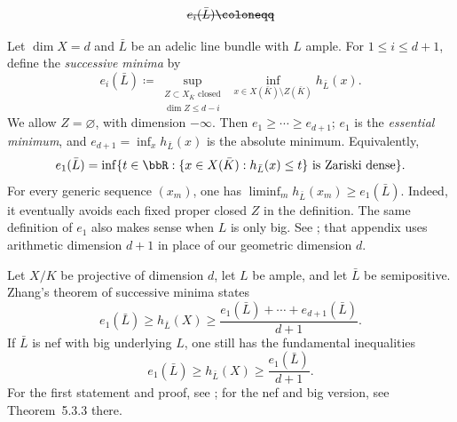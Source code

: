 \begin{definition}[label=\labelNFM{def:successive-minima}, status=draft, tag=0000000]
	\[ \latexdeletedmath{e_i(\bar L) \coloneqq} \]
	\Yang{}
	\begin{latexmathchange}
	Let $\dim X = d$ and $\bar L$ be an adelic line bundle with $L$ ample.
	For $1 \leq i \leq d+1$, define the \emph{successive minima} by
	\[ e_i(\bar L) \coloneqq \sup_{\substack{Z \subset X_{\bar K}\text{ closed}\\\dim Z \leq d-i}}\ \inf_{x \in X(\bar K)\setminus Z(\bar K)} h_{\bar L}(x). \]
	We allow $Z = \varnothing$, with dimension $-\infty$.
	Then $e_1 \geq \cdots \geq e_{d+1}$; $e_1$ is the \emph{essential minimum}, and $e_{d+1} = \inf_x h_{\bar L}(x)$ is the absolute minimum.
	Equivalently,
	\[ e_1(\bar L) = \inf\{t \in \bbR:\{x \in X(\bar K):h_{\bar L}(x) \leq t\}\text{ is Zariski dense}\}. \]
	For every generic sequence $(x_m)$, one has $\liminf_m h_{\bar L}(x_m) \geq e_1(\bar L)$.
	Indeed, it eventually avoids each fixed proper closed $Z$ in the definition.
	The same definition of $e_1$ also makes sense when $L$ is only big.
	See \cite[Appendix~A.5.5]{Yuan-Zhang-2026-AdelicLineBundles}; that appendix uses arithmetic dimension $d+1$ in place of our geometric dimension $d$.
	\end{latexmathchange}
\end{definition}

\begin{theorem}[label=\labelNFM{thm:fundamental-inequality-IV}, status=draft, tag=0000000]

	\Yang{}
	\begin{latexmathchange}
	Let $X/K$ be projective of dimension $d$, let $L$ be ample, and let $\bar L$ be semipositive.
	Zhang's theorem of successive minima states
	\[ e_1(\bar L) \geq h_{\bar L}(X) \geq \frac{e_1(\bar L)+\cdots+e_{d+1}(\bar L)}{d+1}. \]
	If $\bar L$ is nef with big underlying $L$, one still has the fundamental inequalities
	\[ e_1(\bar L) \geq h_{\bar L}(X) \geq \frac{e_1(\bar L)}{d+1}. \]
	For the first statement and proof, see \cite[Theorem~A.5.2]{Yuan-Zhang-2026-AdelicLineBundles}; for the nef and big version, see Theorem~5.3.3 there.
	\end{latexmathchange}
\end{theorem}

